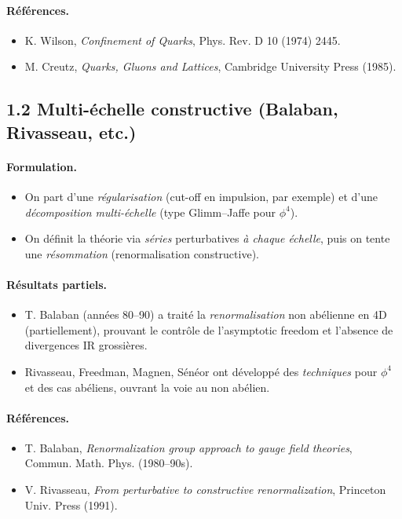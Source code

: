 \documentclass[11pt]{article}
\begin{document}
\paragraph{Références.}
\begin{itemize}
  \item K. Wilson, \emph{Confinement of Quarks}, Phys. Rev. D 10 (1974) 2445.
  \item M. Creutz, \emph{Quarks, Gluons and Lattices}, Cambridge University Press (1985).
\end{itemize}

\subsection*{1.2 Multi-échelle constructive (Balaban, Rivasseau, etc.)}

\paragraph{Formulation.}
\begin{itemize}
  \item On part d'une \emph{régularisation} (cut-off en impulsion, par exemple) et d'une \emph{décomposition multi-échelle} (type Glimm--Jaffe pour $\phi^4$).
  \item On définit la théorie via \emph{séries} perturbatives \emph{à chaque échelle}, puis on tente une \emph{résommation} (renormalisation constructive).
\end{itemize}

\paragraph{Résultats partiels.}
\begin{itemize}
  \item T. Balaban (années 80--90) a traité la \emph{renormalisation} non abélienne en 4D (partiellement), prouvant le contrôle de l'asymptotic freedom et l'absence de divergences IR grossières.
  \item Rivasseau, Freedman, Magnen, Sénéor ont développé des \emph{techniques} pour $\phi^4$ et des cas abéliens, ouvrant la voie au non abélien.
\end{itemize}

\paragraph{Références.}
\begin{itemize}
  \item T. Balaban, \emph{Renormalization group approach to gauge field theories}, Commun. Math. Phys. (1980--90s).
  \item V. Rivasseau, \emph{From perturbative to constructive renormalization}, Princeton Univ. Press (1991).
\end{itemize}
\end{document}
